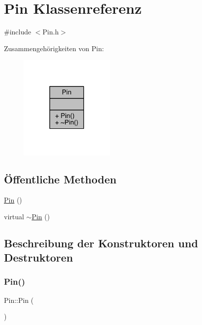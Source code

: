 \hypertarget{class_pin}{}\section{Pin Klassenreferenz}
\label{class_pin}


{\ttfamily \#include $<$Pin.\+h$>$}



Zusammengehörigkeiten von Pin\+:\nopagebreak
\begin{figure}[H]
\begin{center}
\leavevmode
\includegraphics[width=132pt]{class_pin__coll__graph}
\end{center}
\end{figure}
\subsection*{Öffentliche Methoden}
\begin{DoxyCompactItemize}
\item 
\hyperlink{class_pin_aaf3d92065cd9b9de91f01164bec418ea}{Pin} ()
\item 
virtual \hyperlink{class_pin_a462c14c45d3d653731dde638aa6e7bb7}{$\sim$\+Pin} ()
\end{DoxyCompactItemize}


\subsection{Beschreibung der Konstruktoren und Destruktoren}
\hypertarget{class_pin_aaf3d92065cd9b9de91f01164bec418ea}{}\label{class_pin_aaf3d92065cd9b9de91f01164bec418ea} 
\subsubsection{\texorpdfstring{Pin()}{Pin()}}
{\footnotesize\ttfamily Pin\+::\+Pin (\begin{DoxyParamCaption}{ }\end{DoxyParamCaption})}

